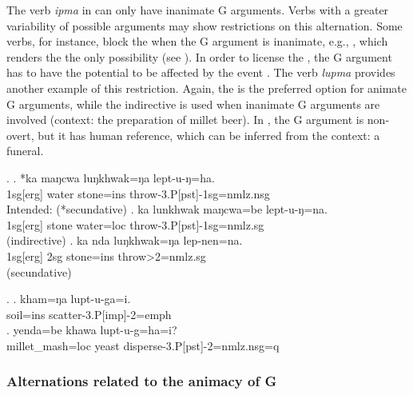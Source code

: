 The verb \emph{ipma}  in \Last can only have inanimate G arguments. Verbs with a greater variability of possible arguments may show restrictions on this alternation. Some verbs, for instance, block the  when the G argument is inanimate, e.g.,  \Next[a], which renders the  the only possibility (see \Next[b]). In order to license the , the G argument has to have the potential to be affected by the event \Next[c].  
The verb \emph{lupma}  provides another example of this restriction. Again, the  is the preferred option for animate G arguments, while the indirective is used when inanimate G arguments are involved \NNext[b] (context: the preparation of millet beer). In \NNext[a], the G argument is non-overt, but it has human reference, which can be inferred from the context: a funeral. 

\ex.	\ag.  *ka maŋcwa luŋkhwak=ŋa lept-u-ŋ=ha.\\
	{\sc 1sg[erg]} water stone{\sc =ins}	throw{\sc -3.P[pst]-1sg=nmlz.nsg}	\\
	Intended:    (*secundative)
	\bg.  ka lunkhwak maŋcwa=be  lept-u-ŋ=na.\\
	{\sc 1sg[erg]} stone  water{\sc =loc}  	throw{\sc -3.P[pst]-1sg=nmlz.sg}	\\
   (indirective)  
 \bg. ka nda luŋkhwak=ŋa lep-nen=na.\\
 {\sc 1sg[erg]} {\sc 2sg} stone{\sc =ins}	throw{>2=nmlz.sg}	\\
  (secundative)

\ex. \ag. kham=ŋa lupt-u-ga=i.\\ 
	soil{\sc =ins} scatter{\sc -3.P[imp]-2=emph} \\
	\bg. yenda=be khawa lupt-u-g=ha=i?\\
	millet\_mash{\sc =loc} yeast disperse{\sc -3.P[pst]-2=nmlz.nsg=q}   \\
	 
 
\subsubsection{Alternations related to the animacy of G}\label{loc-alt}
 
